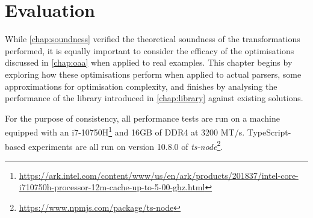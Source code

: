 \chapter{Evaluation}
\label{chap:evaluation}

While \autoref{chap:soundness} verified the theoretical soundness of the transformations performed, it is equally important to consider the efficacy of the optimisations discussed in \autoref{chap:oaa} when applied to real examples.
This chapter begins by exploring how these optimisations perform when applied to actual parsers, some approximations for optimisation complexity, and finishes by analysing the performance of the library introduced in \autoref{chap:library} against existing solutions.

For the purpose of consistency, all performance tests are run on a machine equipped with an i7-10750H\footnote{\url{https://ark.intel.com/content/www/us/en/ark/products/201837/intel-core-i710750h-processor-12m-cache-up-to-5-00-ghz.html}} and 16GB of DDR4 at 3200 MT/s.
TypeScript-based experiments are all run on version 10.8.0 of \textit{ts-node}\footnote{\url{https://www.npmjs.com/package/ts-node}}.



